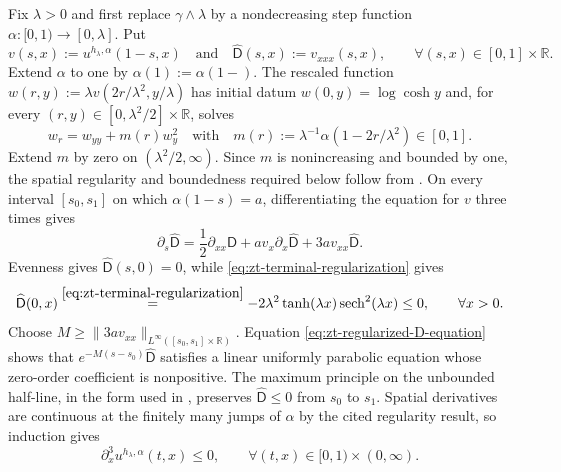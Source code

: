 \documentclass[10pt]{amsart}
\theoremstyle{definition}
\theoremstyle{remark}
\numberwithin{equation}{section}
\newcommand{\R}{\mathbb R}
\newcommand{\1}{\mathbf 1}
\newcommand{\sech}{\operatorname{sech}}
\newcommand{\stackref}[2]{\stackrel{#2}{#1}}
\begin{document}
Fix $\lambda>0$ and first replace $\gamma\wedge\lambda$ by a nondecreasing step function $\alpha:[0,1)\to[0,\lambda]$. Put
\begin{equation*}
 v(s,x):=u^{h_\lambda,\alpha}(1-s,x)
 \quad\text{and}\quad
 \widehat{\mathsf D}(s,x):=v_{xxx}(s,x),
 \qquad \forall (s,x)\in[0,1]\times\R.
\end{equation*}
Extend $\alpha$ to one by $\alpha(1):=\alpha(1-)$. The rescaled function $w(r,y):=\lambda v(2r/\lambda^2,y/\lambda)$ has initial datum $w(0,y)=\log\cosh y$ and, for every $(r,y)\in[0,\lambda^2/2]\times\R$, solves
\begin{equation*}
 w_r=w_{yy}+m(r)w_y^2
 \quad\text{with}\quad
 m(r):=\lambda^{-1}\alpha(1-2r/\lambda^2)\in[0,1].
\end{equation*}
Extend $m$ by zero on $(\lambda^2/2,\infty)$. Since $m$ is nonincreasing and bounded by one, the spatial regularity and boundedness required below follow from \cite[Theorem~4, Lemma~10, and Corollary~11]{JagannathTobascoDynamic}. On every interval $[s_0,s_1]$ on which $\alpha(1-s)=a$, differentiating the equation for $v$ three times gives
\begin{equation}
 \partial_s\widehat{\mathsf D}
 =\frac12\partial_{xx}\widehat{\mathsf D}
 +av_x\partial_x\widehat{\mathsf D}
 +3av_{xx}\widehat{\mathsf D}.
 \label{eq:zt-regularized-D-equation}
\end{equation}
Evenness gives $\widehat{\mathsf D}(s,0)=0$, while \eqref{eq:zt-terminal-regularization} gives
\begin{equation*}
 \widehat{\mathsf D}(0,x)
 \stackref{=}{\eqref{eq:zt-terminal-regularization}}
 -2\lambda^2\tanh(\lambda x)\sech^2(\lambda x)\leq0,
 \qquad \forall x>0.
\end{equation*}
Choose $M\geq\|3av_{xx}\|_{L^\infty([s_0,s_1]\times\R)}$. Equation \eqref{eq:zt-regularized-D-equation} shows that $e^{-M(s-s_0)}\widehat{\mathsf D}$ satisfies a linear uniformly parabolic equation whose zero-order coefficient is nonpositive. The maximum principle on the unbounded half-line, in the form used in \cite[proof of Lemma~8]{JagannathTobascoDynamic}, preserves $\widehat{\mathsf D}\leq0$ from $s_0$ to $s_1$. Spatial derivatives are continuous at the finitely many jumps of $\alpha$ by the cited regularity result, so induction gives
\begin{equation*}
 \partial_x^3u^{h_\lambda,\alpha}(t,x)\leq0,
 \qquad \forall (t,x)\in[0,1)\times(0,\infty).
\end{equation*}
\end{document}
